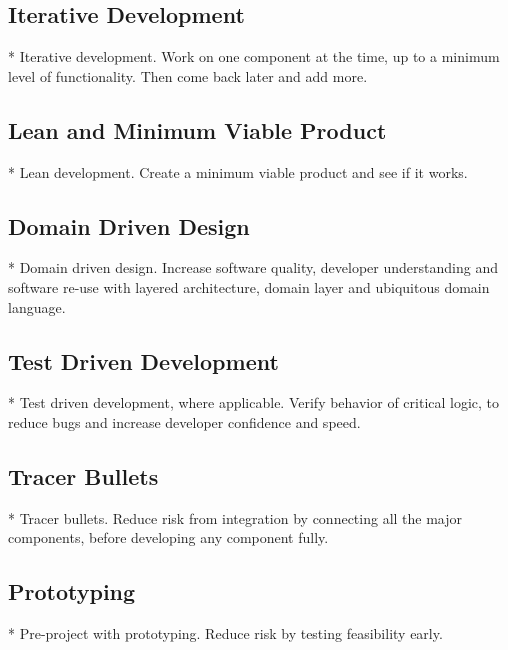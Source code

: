 \subsection{Iterative Development}
* Iterative development. Work on one component at the time, up to a minimum level of functionality. Then come back later and add more.


\subsection{Lean and Minimum Viable Product}

* Lean development. Create a minimum viable product and see if it works.

\subsection{Domain Driven Design}

* Domain driven design. Increase software quality, developer understanding and software re-use with layered architecture, domain layer and ubiquitous domain language.

\subsection{Test Driven Development}

* Test driven development, where applicable. Verify behavior of critical logic, to reduce bugs and increase developer confidence and speed.

\subsection{Tracer Bullets}
* Tracer bullets. Reduce risk from integration by connecting all the major components, before developing any component fully.

\subsection{Prototyping}

* Pre-project with prototyping. Reduce risk by testing feasibility early.
